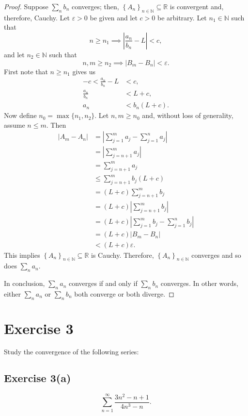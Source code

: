 \documentclass[12pt]{article}
\newenvironment{problem}
    {\begin{lrbox}{\mybox}\begin{minipage}{0.98\textwidth}}
    {\end{minipage}\end{lrbox}\framebox[\textwidth]{\usebox{\mybox}}}
\let\eps\varepsilon %
\newcommand{\N}{\mathbb{N}} %
\newcommand{\R}{\mathbb{R}} %
\newcommand{\<}{\left\langle} %
\renewcommand{\>}{\right\rangle} %
\newcommand{\seq}[2][n]{\left\{#2\right\}_{#1\in\N}} %
\begin{document}
\begin{proof}
    Suppose $\sum_n b_n$ converges; then, $\seq{A_n}\subseteq\R$ is convergent and, therefore, Cauchy. Let $\eps>0$ be given and let $c>0$ be arbitrary. Let $n_1\in\N$ such that
    \[n\geq n_1 \implies \left|\frac{a_n}{b_n} - L\right| < c,\]
    and let $n_2\in\N$ such that
    \[n,m\geq n_2 \implies |B_m - B_n| < \eps.\]
    First note that $n\geq n_1$ gives us
    \begin{align*}
        -c < \frac{a_n}{b_n} - L &< c, \\[1em]
        \frac{a_n}{b_n} &< L+c, \\[1em]
        a_n &< b_n(L+c).
    \end{align*}
    Now define $n_0=\max\{n_1,n_2\}$. Let $n,m\geq n_0$ and, without loss of generality, assume $n\leq m$. Then
    \begin{align*}
        |A_m - A_n|
            &= \left|\sum_{j=1}^m a_j - \sum_{j=1}^n a_j\right| \\
            &= \left|\sum_{j=n+1}^m a_j\right| \\
            &= \sum_{j=n+1}^m a_j \\
            &\leq \sum_{j=n+1}^m b_j(L+c) \\
            &= (L+c) \sum_{j=n+1}^m b_j \\
            &= (L+c)\left|\sum_{j=n+1}^m b_j\right| \\
            &= (L+c)\left|\sum_{j=1}^m b_j - \sum_{j=1}^n b_j\right| \\
            &= (L+c)|B_m - B_n| \\
            &< (L+c)\eps.
    \end{align*}
    This implies $\seq{A_n}\subseteq\R$ is Cauchy. Therefore, $\seq{A_n}$ converges and so does $\sum_n a_n$.
    
    In conclusion, $\sum_n a_n$ converges if and only if $\sum_n b_n$ converges. In other words, either $\sum_n a_n$ or $\sum_n b_n$ both converge or both diverge.
    
\end{proof}

\newpage
\section*{Exercise 3}
\begin{problem}
    Study the convergence of the following series:
\end{problem}

\subsection*{Exercise 3(a)}
\begin{problem}
    \begin{equation}\label{118A-H07-3a}
        \sum_{n=1}^\infty \frac{3n^2-n+1}{4n^3-n}.
    \end{equation}
\end{problem}
\end{document}

